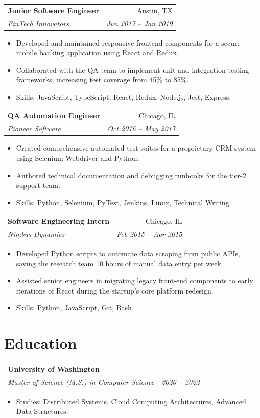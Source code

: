 \documentclass[10pt,letterpaper]{article}
\makeatletter
\newcommand{\entry}[4]{%
  \begin{tabularx}{\linewidth}{@{}X r@{}}
    \textbf{#1} & #2 \\
    \textit{#3} & \textit{#4} \\
  \end{tabularx}%
}
\makeatother
\begin{document}
\entry{Junior Software Engineer}{Austin, TX}
      {FinTech Innovators}{Jun 2017 -- Jan 2019}
\begin{itemize}
  \item Developed and maintained responsive frontend components for a secure mobile banking application using React and Redux.
  \item Collaborated with the QA team to implement unit and integration testing frameworks, increasing test coverage from 45\% to 85\%.
  \item Skills: JavaScript, TypeScript, React, Redux, Node.js, Jest, Express.  
\end{itemize}

\vspace{4pt}

\entry{QA Automation Engineer}{Chicago, IL}
      {Pioneer Software}{Oct 2016 -- May 2017}
\begin{itemize}
  \item Created comprehensive automated test suites for a proprietary CRM system using Selenium Webdriver and Python.
  \item Authored technical documentation and debugging runbooks for the tier-2 support team.
  \item Skills: Python, Selenium, PyTest, Jenkins, Linux, Technical Writing.
\end{itemize}

\vspace{4pt}

\entry{Software Engineering Intern}{Chicago, IL}
      {Nimbus Dynamics}{Feb 2015 -- Apr 2015}
\begin{itemize}
  \item Developed Python scripts to automate data scraping from public APIs, saving the research team 10 hours of manual data entry per week.
  \item Assisted senior engineers in migrating legacy front-end components to early iterations of React during the startup's core platform redesign.
  \item Skills: Python, JavaScript, Git, Bash.
\end{itemize}

\section{Education}

\entry{University of Washington}{}
      {Master of Science (M.S.) in Computer Science}{2020 -- 2022}
\begin{itemize}
  \item Studies: Distributed Systems, Cloud Computing Architectures, Advanced Data Structures.
\end{itemize}
\end{document}
